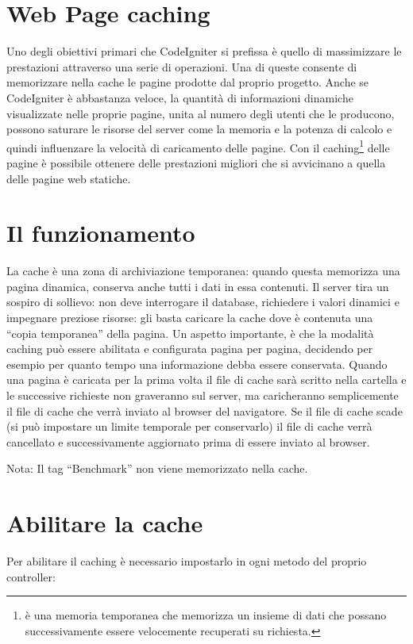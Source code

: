 \section{Web Page caching}
\label{cap:cache}

Uno degli obiettivi primari che CodeIgniter si prefissa è quello di massimizzare le prestazioni attraverso una serie di operazioni. Una di queste consente di memorizzare nella cache le pagine prodotte dal proprio progetto. Anche se CodeIgniter è abbastanza veloce, la quantità di informazioni dinamiche visualizzate nelle proprie pagine, unita al numero degli utenti che le producono, possono saturare le risorse del server come la memoria e la potenza di calcolo e quindi influenzare la velocità di caricamento delle pagine. Con il caching\footnote{è una memoria temporanea che memorizza un insieme di dati che possano successivamente essere velocemente recuperati su richiesta.} delle pagine è possibile ottenere delle prestazioni migliori che si avvicinano a quella delle pagine web statiche.

\section*{Il funzionamento}
La cache è una zona di archiviazione temporanea: quando questa memorizza una pagina dinamica, conserva anche tutti i dati in essa contenuti. Il server tira un sospiro di sollievo: non deve interrogare il database, richiedere i valori dinamici e impegnare preziose risorse: gli basta caricare la cache dove è contenuta una ``copia temporanea'' della pagina. Un aspetto importante, è che la modalità caching può essere abilitata e configurata pagina per pagina, decidendo per esempio per quanto tempo una informazione debba essere conservata. Quando una pagina è caricata per la prima volta il file di cache sarà scritto nella cartella  e le successive richieste non graveranno sul server, ma caricheranno semplicemente il file di cache che verrà inviato al browser del navigatore. Se il file di cache scade (si può impostare un limite temporale per conservarlo) il file di cache verrà cancellato e successivamente aggiornato prima di essere inviato al browser.

Nota: Il tag ``Benchmark'' non viene memorizzato nella cache.

\section*{Abilitare la cache}
Per abilitare il caching è necessario impostarlo in ogni metodo del proprio controller:


